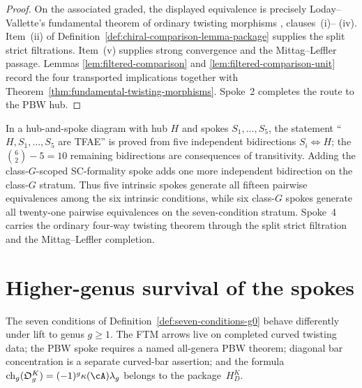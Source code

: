 \begin{proof}
On the associated graded, the displayed equivalence is precisely
Loday--Vallette's fundamental theorem of ordinary twisting morphisms
\cite[Theorem~2.3.2]{LodayVallette12}, clauses~\textup{(i)}--
\textup{(iv)}.  Item~\textup{(ii)} of
Definition~\ref{def:chiral-comparison-lemma-package} supplies the
split strict filtrations.  Item~\textup{(v)} supplies strong
convergence and the Mittag--Leffler passage.  Lemmas
\ref{lem:filtered-comparison} and
\ref{lem:filtered-comparison-unit} record the four transported
implications together with
Theorem~\ref{thm:fundamental-twisting-morphisms}.  Spoke~2 completes
the route to the PBW hub.
\end{proof}

\begin{remark}
\label{rem:ftm-hub-combinatorics}
In a hub-and-spoke diagram with hub $H$ and spokes
$S_1,\dots,S_5$, the statement
``$H,S_1,\dots,S_5$ are TFAE'' is proved from five independent
bidirections $S_i\Leftrightarrow H$; the
$\binom{6}{2}-5=10$ remaining bidirections are consequences of
transitivity.  Adding the class-$G$-scoped SC-formality spoke adds
one more independent bidirection on the class-$G$ stratum.  Thus five
intrinsic spokes generate all fifteen pairwise equivalences among the
six intrinsic conditions, while six class-$G$ spokes generate all
twenty-one pairwise equivalences on the seven-condition stratum.
Spoke~4 carries the ordinary four-way twisting theorem through the
split strict filtration and the Mittag--Leffler completion.
\end{remark}

\section{Higher-genus survival of the spokes}
\label{sec:ftm-higher-genus}

The seven conditions of
Definition~\ref{def:seven-conditions-g0} behave differently under
lift to genus $g \geq 1$.  The FTM arrows live on completed curved
twisting data; the PBW spoke requires a named all-genera PBW theorem;
diagonal bar concentration is a separate curved-bar assertion; and
the formula
$\operatorname{ch}_g(\mathfrak O_g^K)=(-1)^g\kappa(\cA)\lambda_g$
belongs to the package~$H_D^K$.

